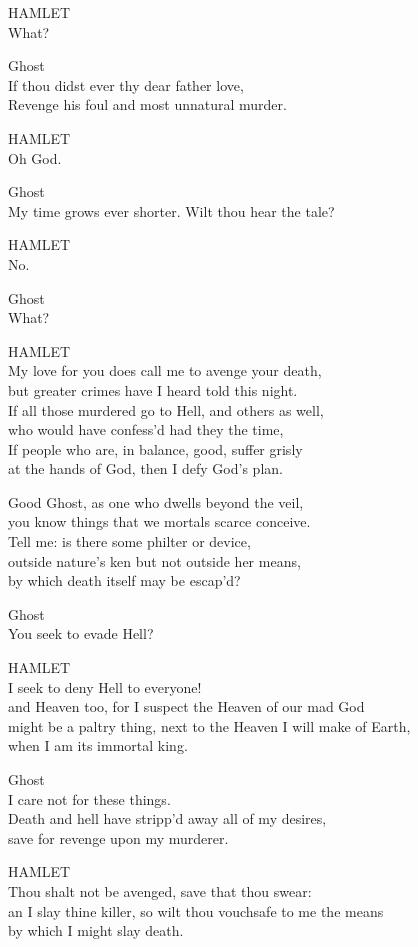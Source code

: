 HAMLET\\What?

Ghost\\If thou didst ever thy dear father love,\\Revenge his foul and
most unnatural murder.

HAMLET\\Oh God.

Ghost\\My time grows ever shorter. Wilt thou hear the tale?

HAMLET\\No.

Ghost\\What?

HAMLET\\My love for you does call me to avenge your death,\\but greater
crimes have I heard told this night.\\If all those murdered go to Hell,
and others as well,\\who would have confess'd had they the time,\\If
people who are, in balance, good, suffer grisly\\at the hands of God,
then I defy God's plan.

Good Ghost, as one who dwells beyond the veil,\\you know things that we
mortals scarce conceive.\\Tell me: is there some philter or
device,\\outside nature's ken but not outside her means,\\by which death
itself may be escap'd?

Ghost\\You seek to evade Hell?

HAMLET\\I seek to deny Hell to everyone!\\and Heaven too, for I suspect
the Heaven of our mad God\\might be a paltry thing, next to the Heaven I
will make of Earth,\\when I am its immortal king.

Ghost\\I care not for these things.\\Death and hell have stripp'd away
all of my desires,\\save for revenge upon my murderer.

HAMLET\\Thou shalt not be avenged, save that thou swear:\\an I slay
thine killer, so wilt thou vouchsafe to me the means\\by which I might
slay death.

